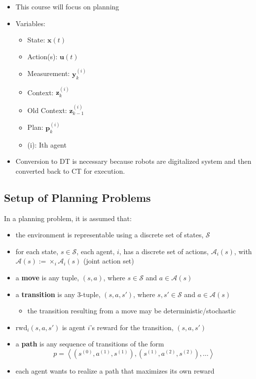 \begin{summary}
    \begin{itemize}
        \item This course will focus on planning
        \item Variables:
        \begin{itemize}
            \item State: $\mathbf{x}(t)$
            \item Action(s): $\mathbf{u}(t)$
            \item Measurement: $\mathbf{y}_k^{(i)}$
            \item Context: $\mathbf{z}_k^{(i)}$
            \item Old Context: $\mathbf{z}_{k-1}^{(i)}$
            \item Plan: $\mathbf{p}_k^{(i)}$
            \item (i): Ith agent
        \end{itemize}
        \item Conversion to DT is necessary because robots are digitalized system and then converted back to CT for execution.
    \end{itemize}
\end{summary}

\subsection{Setup of Planning Problems}
\begin{definition}
In a planning problem, it is assumed that:
    \begin{itemize}
        \item the environment is representable using a discrete set of states, $\mathcal{S}$
        \item for each state, $s \in \mathcal{S}$, each agent, $i$, has a discrete set of actions, $\mathcal{A}_i(s)$, with $\mathcal{A}(s) := \times_i \mathcal{A}_i(s)$ (joint action set)
        \item a \textbf{move} is any tuple, $(s, a)$, where $s \in \mathcal{S}$ and $a \in \mathcal{A}(s)$
        \item a \textbf{transition} is any 3-tuple, $(s, a, s')$, where $s, s' \in \mathcal{S}$ and $a \in \mathcal{A}(s)$
        \begin{itemize}
            \item the transition resulting from a move may be deterministic/stochastic
        \end{itemize}
        \item $\text{rwd}_i(s, a, s')$ is agent $i$'s reward for the transition, $(s, a, s')$
        \item a \textbf{path} is any sequence of transitions of the form
        \[
        p = \left\langle (s^{(0)}, a^{(1)}, s^{(1)}), (s^{(1)}, a^{(2)}, s^{(2)}), \ldots \right\rangle
        \]
        \item each agent wants to realize a path that maximizes its own reward
    \end{itemize}
\end{definition}

